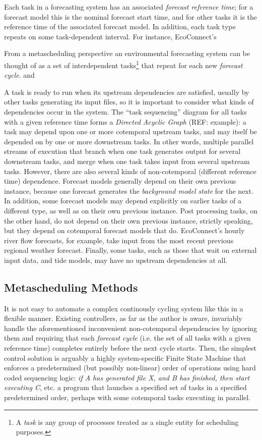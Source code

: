 \documentclass[11pt,a4paper]{article}
\begin{document}
Each task in a forecasting
system has an associated {\em forecast reference time}; for a forecast
model this is the nominal forecast start time, and for other tasks it is
the reference time of the associated forecast model.  In addition, each
task type repeats on some task-dependent interval.  For instance,
EcoConnect's   



From a metascheduling perspective an environmental forecasting system
can be thought of as a set of interdependent tasks\footnote{A {\em task}
is any group of processes treated as a single entity for scheduling
purposes.} that repeat for each new {\em forecast cycle}. and


A task is ready to run when its upstream dependencies are satisfied,
usually by other tasks generating its input files, so it is important to
consider what kinds of dependencies occur in the system.  The ``task
sequencing'' diagram for all tasks with a given reference time forms a
{\em Directed Acyclic Graph} (REF: example): a task may depend upon one
or more cotemporal upstream tasks, and may itself be depended on by one
or more downstream tasks. In other words, multiple parallel streams of
execution that branch when one task generates output for several
downstream tasks, and merge when one task takes input from several
upstream tasks.  However, there are also several kinds of non-cotemporal
(different reference time) dependence.  Forecast models generally depend
on their own previous instance, because one forecast generates the {\em
background model state} for the next.  In addition, some forecast models
may depend explicitly on earlier tasks of a different type, as well as
on their own previous instance.  Post processing tasks, on the other
hand, do not depend on their own previous instance, strictly speaking,
but they depend on cotemporal forecast models that do. EcoConnect's
hourly river flow forecasts, for example, take input from the most
recent previous regional weather forecast.  Finally, some tasks, such as
those that wait on external input data, and tide models, may have no
upstream dependencies at all.

\subsection{Metascheduling Methods}

It is not easy to automate a complex continously cycling system like
this in a flexible manner. Existing controllers, as far as the author is
aware, invariably handle the aforementioned inconvenient non-cotemporal
dependencies by ignoring them and requiring that each {\em forecast
cycle} (i.e. the set of all tasks with a given reference time) completes
entirely before the next cycle starts. Then, the simplest control
solution is arguably a highly system-specific Finite State Machine that
enforces a predetermined (but possibly non-linear) order of operations
using hard coded sequencing logic: {\em if A has generated file X, and B
has finished, then start executing C}, etc. a program that launches a
specified set of tasks in a specified predetermined order, perhaps with
some cotemporal
tasks executing in parallel.
\end{document}
